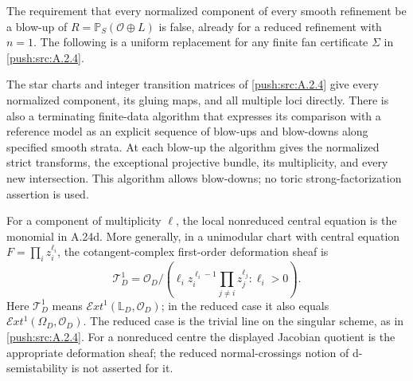 \begin{proposition}\label{push:src:A.2.5}\label{push:A25}
The requirement that every normalized component of every
smooth refinement be a blow-up of
$R=\mathbb P_S(\mathcal O\oplus L)$ is false, already
for a reduced refinement with $n=1$.
The following is a uniform replacement for any finite
fan certificate $\Sigma$ in \ref{push:src:A.2.4}.

The star charts and integer transition matrices of \ref{push:src:A.2.4}
give every normalized component, its gluing maps, and
all multiple loci directly. There is also a terminating
finite-data algorithm that expresses its comparison
with a reference model as an explicit sequence of
blow-ups and blow-downs along specified smooth strata.
At each blow-up the algorithm gives the normalized
strict transforms, the exceptional projective bundle,
its multiplicity, and every new intersection.
This algorithm allows blow-downs; no toric
strong-factorization assertion is used.

For a component of multiplicity $\ell$, the local
nonreduced central equation is the monomial in A.24d.
More generally, in a unimodular chart with central
equation $F=\prod_i z_i^{\ell_i}$, the cotangent-complex
first-order deformation sheaf is
\[
 \mathcal T^1_D
  =\mathcal O_D\Big/
    \left(\ell_i z_i^{\ell_i-1}
          \prod_{j\ne i}z_j^{\ell_j}:\ell_i>0\right).
 \tag{A.25a}
\]
Here $\mathcal T^1_D$ means
$\mathcal Ext^1(\mathbb L_D,\mathcal O_D)$; in the
reduced case it also equals
$\mathcal Ext^1(\Omega_D,\mathcal O_D)$.
The reduced case is the trivial line on the singular
scheme, as in \ref{push:src:A.2.4}. For a nonreduced centre the displayed
Jacobian quotient is the appropriate deformation sheaf;
the reduced normal-crossings notion of d-semistability
is not asserted for it.
\end{proposition}

